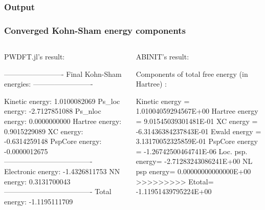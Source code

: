 \begin{frame}[fragile]
\frametitle{Output}


\end{frame}


\begin{frame}[fragile]
\frametitle{Converged Kohn-Sham energy components}

\begin{columns}[T]

\begin{column}{0.45\textwidth}
PWDFT.jl's result:
\begin{textcode}
-------------------------
Final Kohn-Sham energies:
-------------------------

Kinetic    energy:       1.0100082069
Ps_loc     energy:      -2.7127851088
Ps_nloc    energy:       0.0000000000
Hartree    energy:       0.9015229089
XC         energy:      -0.6314259148
PspCore    energy:      -0.0000012675
-------------------------------------
Electronic energy:      -1.4326811753
NN         energy:       0.3131700043
-------------------------------------
Total      energy:      -1.1195111709
\end{textcode}
\end{column}

\begin{column}{0.55\textwidth}

ABINIT's result:
\begin{textcode}
Components of total free energy (in Hartree) :

   Kinetic energy  =  1.01004059294567E+00
   Hartree energy  =  9.01545039301481E-01
   XC energy       = -6.31436384237843E-01
   Ewald energy    =  3.13170052325859E-01
   PspCore energy  = -1.26742500464741E-06
   Loc. psp. energy= -2.71283243086241E+00
   NL   psp  energy=  0.00000000000000E+00
   >>>>>>>>> Etotal= -1.11951439795224E+00
\end{textcode}
\end{column}

\end{columns}

\end{frame}